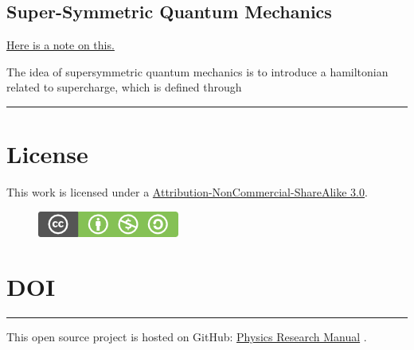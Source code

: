 \documentclass[letterpaper,10pt,english]{sphinxmanual}
\begin{document}
\section{Super-Symmetric Quantum Mechanics}
\label{Quantum/susyQuantum:super-symmetric-quantum-mechanics}\label{Quantum/susyQuantum::doc}
\href{http://arxiv.org/abs/hep-ph/9907295}{Here is a note on this.}

The idea of supersymmetric quantum mechanics is to introduce a hamiltonian related to supercharge, which is defined through


\bigskip\hrule{}\bigskip



\chapter{License}
\label{index:license}
This work is licensed under a \href{http://creativecommons.org/licenses/by-nc-sa/3.0/}{Attribution-NonCommercial-ShareAlike 3.0}.
\begin{figure}[htbp]
\centering
\href{http://creativecommons.org/licenses/by-nc-sa/3.0/us/}{\includegraphics{cc_byncsa.png}}\end{figure}


\chapter{DOI}
\label{index:doi}\href{http://dx.doi.org/10.5281/zenodo.13216}{}

\bigskip\hrule{}\bigskip


This open source project is hosted on GitHub: \href{https://github.com/CosmologyTaskForce/PhysicsResearchSurvivalManual}{Physics Research Manual} .



\renewcommand{\indexname}{Index}
\printindex
\end{document}
